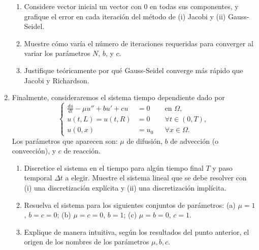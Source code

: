 \documentclass{article}
\begin{document}
\begin{enumerate}
    \begin{enumerate}
        \item  Considere vector inicial un vector con 0 en todas sus componentes, y grafique el error en cada iteración del método de (i) Jacobi y (ii) Gauss-Seidel.
        \item Muestre cómo varía el número de iteraciones requeridas para converger al variar los parámetros $N$, $b$, y $c$.
        \item Justifique teóricamente por qué Gauss-Seidel converge más rápido que Jacobi y Richardson. 
    \end{enumerate}

\item Finalmente, consideraremos el sistema tiempo dependiente dado por
        $$
            \left\lbrace\begin{aligned}
                \frac{d u}{d t}- \mu u'' + b u' + c u &= 0 && \text{en $\Omega$},\\
                u(t, L) = u(t, R) &= 0 &&\forall t\in (0,T), \\ 
                u(0, x) &= u_0 &&\forall x\in \Omega.
            \end{aligned}\right.
        $$
Los parámetros que aparecen son: $\mu$ de difusión, $b$ de advección (o convección), y $c$ de reacción. 

    \begin{enumerate}
        \item Discretice el sistema en el tiempo para algún tiempo final $T$ y paso temporal $\Delta t$ a elegir. Muestre el sistema lineal que se debe resolver con (i) una discretización explícita y (ii) una discretización implícita.
        \item Resuelva el sistema para los siguientes conjuntos de parámetros: (a) $\mu=1$, $b=c=0$; (b) $\mu=c=0$, $b=1$; (c) $\mu=b=0$, $c=1$.
        \item Explique de manera intuitiva, según los resultados del punto anterior, el origen de los nombres de los parámetros $\mu,b,c$.
    \end{enumerate}
\end{enumerate}
\end{document}

